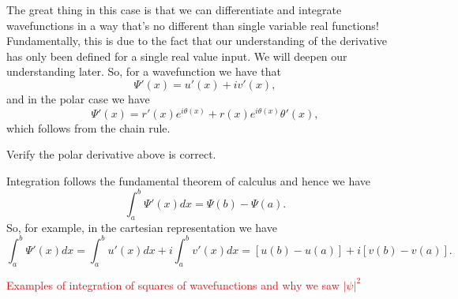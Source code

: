 The great thing in this case is that we can differentiate and integrate wavefunctions in a way that's no different than single variable real functions!  Fundamentally, this is due to the fact that our understanding of the derivative has only been defined for a single real value input. We will deepen our understanding later.  So, for a wavefunction we have that
\[
\Psi'(x)=u'(x)+iv'(x),
\]
and in the polar case we have
\[
\Psi'(x)=r'(x)e^{i\theta(x)}+r(x)e^{i\theta(x)}\theta'(x),
\]
which follows from the chain rule.

\begin{exercise}
	Verify the polar derivative above is correct.
\end{exercise}

Integration follows the fundamental theorem of calculus and hence we have
\[
\int_a^b \Psi'(x)dx = \Psi(b)-\Psi(a).
\]
So, for example, in the cartesian representation we have
\[
\int_a^b \Psi'(x)dx = \int_a^b u'(x)dx+i\int_a^b v'(x)dx = [u(b)-u(a)]+i[v(b)-v(a)].
\]

\textcolor{red}{Examples of integration of squares of wavefunctions and why we saw $|\psi|^2$}
